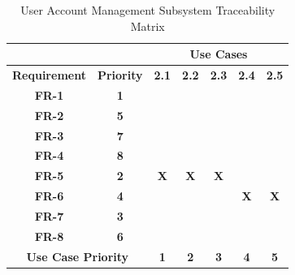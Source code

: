 \documentclass{article}
\begin{document}
\begin{enumerate}
\begin{table}
\centering
\caption{User Account Management Subsystem Traceability Matrix}
\label{my-label}
\begin{tabular}{|c|c|c|c|c|c|c|}
\hline
\multicolumn{2}{|c|}{}                           & \multicolumn{5}{c|}{\textbf{Use Cases}}                                  \\ \hline
\textbf{Requirement}     & \textbf{Priority}     & \textbf{2.1} & \textbf{2.2} & \textbf{2.3} & \textbf{2.4} & \textbf{2.5} \\ \hline
\textbf{FR-1}            & \textbf{1}            & \textbf{}    & \textbf{}    & \textbf{}    & \textbf{}    & \textbf{}    \\ \hline
\textbf{FR-2}            & \textbf{5}            & \textbf{}    & \textbf{}    & \textbf{}    & \textbf{}    & \textbf{}    \\ \hline
\textbf{FR-3}            & \textbf{7}            & \textbf{}    & \textbf{}    & \textbf{}    & \textbf{}    & \textbf{}    \\ \hline
\textbf{FR-4}            & \textbf{8}            & \textbf{}    & \textbf{}    & \textbf{}    & \textbf{}    & \textbf{}    \\ \hline
\textbf{FR-5}            & \textbf{2}            & \textbf{X}   & \textbf{X}   & \textbf{X}   & \textbf{}    & \textbf{}    \\ \hline
\textbf{FR-6}            & \textbf{4}            & \textbf{}    & \textbf{}    & \textbf{}    & \textbf{X}   & \textbf{X}   \\ \hline
\textbf{FR-7}            & \textbf{3}            & \textbf{}    & \textbf{}    & \textbf{}    & \textbf{}    & \textbf{}    \\ \hline
\textbf{FR-8}            & \textbf{6}            & \textbf{}    & \textbf{}    & \textbf{}    & \textbf{}    & \textbf{}    \\ \hline
\multicolumn{2}{|c|}{\textbf{Use Case Priority}} & \textbf{1}   & \textbf{2}   & \textbf{3}   & \textbf{4}   & \textbf{5}   \\ \hline
\end{tabular}
\end{table}	


\end{enumerate}
\end{document}
